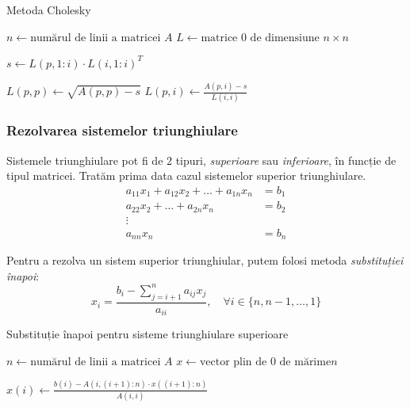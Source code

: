 \documentclass{exam}
\newcommand{\octavescript}[2]{
	
}
\begin{document}

\begin{algorithm}
	\caption{Metoda Cholesky}
	\begin{algorithmic}[1]
		\State \( n \gets \text{numărul de linii a matricei } A \)
		\State \( L \gets \text{matrice 0 de dimensiune } n \times n \)

		\State \( s \gets L(p, 1:i) \cdot L(i, 1:i)^T \)

		\State \( L(p, p) \gets \sqrt{A(p, p) - s} \)
		\Else
		\State \( L(p, i) \gets \frac{A(p, i) - s}{L(i, i)} \)
		\EndIf
		\EndFor
		\EndFor
	\end{algorithmic}
\end{algorithm}

\subsubsection{Rezolvarea sistemelor triunghiulare}

\par Sistemele triunghiulare pot fi de 2 tipuri, \textit{superioare} sau
\textit{inferioare}, în funcție de tipul matricei. Tratăm prima data cazul
sistemelor superior triunghiulare.
\begin{align*}
	a_{11} x_1 + a_{12} x_2 + \ldots + a_{1n} x_n & = b_1 \\
	a_{22} x_2 + \ldots + a_{2n} x_n              & = b_2 \\
	\vdots                                                \\
	a_{nn} x_n                                    & = b_n
\end{align*}

\par Pentru a rezolva un sistem superior triunghiular, putem folosi metoda
\textit{substituției înapoi}:
\begin{equation}
	x_i = \frac{b_i - \sum_{j = i + 1}^{n}{a_{ij} x_j}}{a_{ii}}, \quad \forall i \in \{n, n - 1, \ldots, 1\}
\end{equation}


\begin{algorithm}
	\caption{Substituție înapoi pentru sisteme triunghiulare superioare}
	\begin{algorithmic}[1]
		\State \( n \gets \text{numărul de linii a matricei } A \)
		\State \( x \gets \text{vector plin de 0 de mărime} n \)

		\State \( x(i) \gets \frac{b(i) - A(i, (i+1):n) \cdot x((i+1):n)}{A(i, i)} \)
		\EndFor
	\end{algorithmic}
\end{algorithm}
\end{document}
